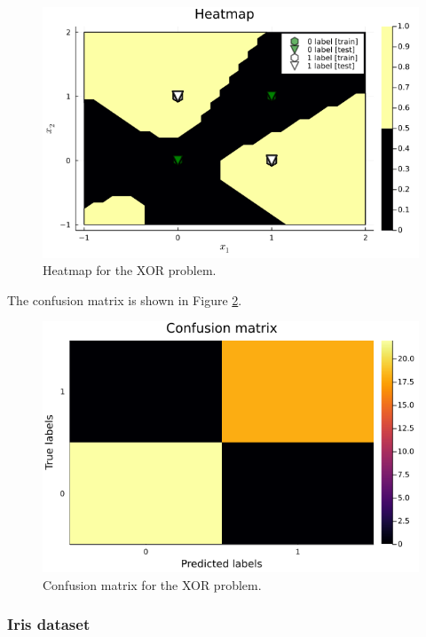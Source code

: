 \documentclass[12pt,a4paper]{article}
\begin{document}
\begin{figure}[H]
    \centering
    \includegraphics[scale=0.35]{../trab5 (MLP)/figs/XOR problem - heatmap - nr1.png}
    \caption{Heatmap for the XOR problem.}
    \label{fig:heatmap-mlp-xor2}
\end{figure}

The confusion matrix is shown in Figure \ref{fig:confusion-matrix-mlp-xor}.
\begin{figure}[H]
    \centering
    \includegraphics[scale=0.35]{../trab5 (MLP)/figs/xor-confusion-matrix.png}
    \caption{Confusion matrix for the XOR problem.}
    \label{fig:confusion-matrix-mlp-xor}
\end{figure}

\subsubsection{Iris dataset}
\end{document}
